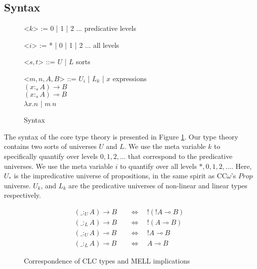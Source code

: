 \documentclass[sigplan,screen,review,authordraft]{acmart}
\theoremstyle{definition}
\newcommand{\indalt}[1][2]{\\\hspace*{-1.2em}\textbar\quad}
\newcommand{\utype}{:_{\scriptscriptstyle U}}
\newcommand{\ltype}{:_{\scriptscriptstyle L}}
\begin{document}
  \subsection{Syntax}
  \begin{figure}[h]
    \vspace{-1.4em}
    \caption{Syntax}
    \vspace{1.4em}
    \begin{grammar}
      <$k$> := 0 | 1 | 2 ... \phantom{* |} \hspace*{3em} predicative levels

      <$i$> := * | 0 | 1 | 2 ... \hspace*{3em} all levels

      <$s, t$> ::= $U$ | $L$ \phantom{| $x$} \hspace*{4.6em} sorts

      <$m, n, A, B$> ::= $U_i$ | $L_k$ | $x$ \hspace*{4em} expressions
      \indalt $(x :_s A) \rightarrow B$
      \indalt $(x :_s A) \multimap B$
      \indalt $\lambda x. n$ | $m\ n$
    \end{grammar}
    \label{syntax}
  \end{figure}
  The syntax of the core type theory is presented in Figure \ref{syntax}. Our type theory contains two sorts of universes $U$ and $L$. We use the meta variable $k$ to specifically quantify over levels $0, 1, 2, ...$ that correspond to the predicative universes. We use the meta variable $i$ to quantify over all levels $*, 0, 1, 2, ...$. Here, $U_*$ is the impredicative universe of propositions, in the same spirit as CC$\omega$'s $Prop$ universe. $U_k$, and $L_k$ are the predicative universes of non-linear and linear types respectively.
  \begin{figure}[H]
    \vspace{-1.4em}
    \caption{Correspondence of CLC types and MELL implications}
    \Description{}
    \vspace{-1em}
    \begin{align}
      (\_ \utype A) \rightarrow B \quad &\Leftrightarrow \quad !(!A \multimap B) \\
      (\_ \ltype A) \rightarrow B \quad &\Leftrightarrow \quad !(A \multimap B) \\
      (\_ \utype A) \multimap B \quad &\Leftrightarrow \quad !A \multimap B \\
      (\_ \ltype A) \multimap B \quad &\Leftrightarrow \quad A \multimap B
    \end{align}
    \vspace{-1.6em}
    \label{correspondence}
  \end{figure}
\end{document}
